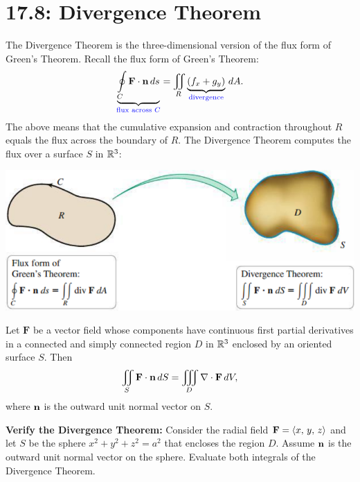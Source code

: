 \documentclass[mathNotesPreamble]{subfiles}
\begin{document}
\section{17.8: Divergence Theorem}

    The Divergence Theorem is the three-dimensional version of the flux form of Green's Theorem. Recall the flux form of Green's Theorem:
    \[\underbrace{\oint\limits_C \mathbf F\cdot {\mathbf{n}}\,ds}_{\textcolor{blue}{\textnormal{flux across }C}}=\iint\limits_R \underbrace{(f_x+g_y)}_{\textcolor{blue}{\textnormal{divergence}}}\,dA.\]
  The above means that the cumulative expansion and contraction throughout $R$ equals the flux across the boundary of $R$. The Divergence Theorem computes the flux over a surface $S$ in $\mathbb{R}^3$:
  \begin{center}
    \includegraphics[width=0.75\linewidth]{images/briggs_17_08/fig17_68}
  \end{center}

  \begin{thmBox*}
    Let $\mathbf F$ be a vector field whose components have continuous first partial derivatives in a connected and simply connected region $D$ in $\mathbb{R}^3$ enclosed by an oriented surface $S$. Then
      \[\iint\limits_S \mathbf F\cdot{\mathbf{n}}\,dS=\iiint\limits_D\nabla\cdot\mathbf F\,dV,\]
    where ${\mathbf{n}}$ is the outward unit normal vector on $S$.
  \end{thmBox*}
  \pagebreak

  \begin{ex*}
    \textbf{Verify the Divergence Theorem:} Consider the radial field $\mathbf F={\left\langle x,\,y,\,z \right\rangle}$ and let $S$ be the sphere $x^2+y^2+z^2=a^2$ that encloses the region $D$. Assume ${\mathbf{n}}$ is the outward unit normal vector on the sphere. Evaluate both integrals of the Divergence Theorem.
  \end{ex*}
  \pagebreak
\end{document}
